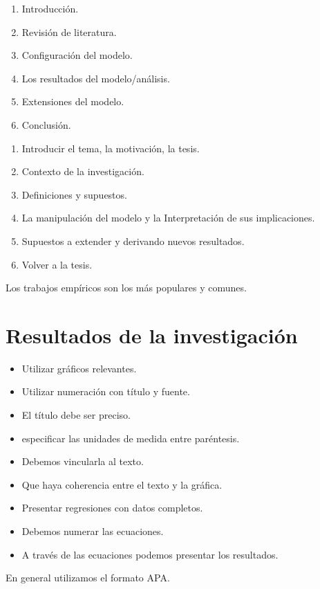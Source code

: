 \begin{multicols}{2}
    \begin{enumerate}[1.]
	\item Introducción.
	\item Revisión de literatura.
	\item Configuración del modelo.
	\item Los resultados del modelo/análisis.	
	\item Extensiones del modelo.
	\item Conclusión.
    \end{enumerate}

    \begin{enumerate}[1.]
	\item Introducir el tema, la motivación, la tesis.
	\item Contexto de la investigación.
	\item Definiciones y supuestos.
	\item La manipulación del modelo y la Interpretación de sus implicaciones.
	\item Supuestos a extender y derivando nuevos resultados.
	\item Volver a la tesis.
    \end{enumerate}
\end{multicols}

Los trabajos empíricos son los más populares y comunes. 

\section{Resultados de la investigación}
\begin{itemize}
    \item Utilizar gráficos relevantes. 
    \item Utilizar numeración con título y fuente.
    \item El título debe ser preciso. 
    \item especificar las unidades de medida entre paréntesis.
    \item Debemos vincularla al texto.
    \item Que haya coherencia entre el texto y la gráfica.
    \item Presentar regresiones con datos completos.
    \item Debemos numerar las ecuaciones.
    \item A través de las ecuaciones podemos presentar los resultados.
\end{itemize}

En general utilizamos el formato APA.

